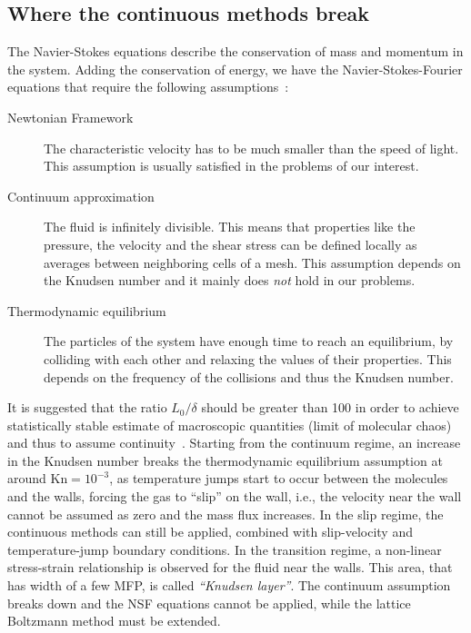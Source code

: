 \subsection{Where the continuous methods break}
The Navier-Stokes equations describe the conservation of mass and momentum in
the system. Adding the conservation of energy, we have the Navier-Stokes-Fourier
equations that require the following assumptions~\cite{Barber2006}:
\begin{description}
 \item[Newtonian Framework] The characteristic velocity has to be much smaller than the speed of light.
 This assumption is usually satisfied in the problems of our interest.
 \item[Continuum approximation] The fluid is infinitely divisible. This means that
 properties like the pressure, the velocity and the shear stress can be defined locally as averages between
 neighboring cells of a mesh. This assumption depends on the Knudsen number and it mainly does \textit{not} hold in our problems.
 \item[Thermodynamic equilibrium] The particles of the system have enough time to reach
 an equilibrium, by colliding with each other and relaxing the values of their properties.
 This depends on the frequency of the collisions and thus the Knudsen number.
\end{description}

It is suggested that the ratio $L_0/\delta$ should be greater than 100 in order
to achieve statistically stable estimate of macroscopic quantities
(limit of molecular chaos) and thus to assume continuity~\cite{Barber2006}.
Starting from the continuum regime, an increase in the Knudsen number breaks
the thermodynamic equilibrium assumption at around $\mathrm{Kn}=10^{-3}$,
as temperature jumps start to occur between the molecules and the walls,
forcing the gas to ``slip'' on the wall, i.e., the velocity near the wall cannot
be assumed as zero and the mass flux increases.
In the slip regime, the continuous methods can still be applied, combined with slip-velocity
and temperature-jump boundary conditions. In the transition regime,
a non-linear stress-strain relationship is observed for the fluid near the walls.
This area, that has width of a few MFP, is called \textit{``Knudsen layer''}. The 
continuum assumption breaks down and the NSF equations cannot be applied, while
the lattice Boltzmann method must be extended.
